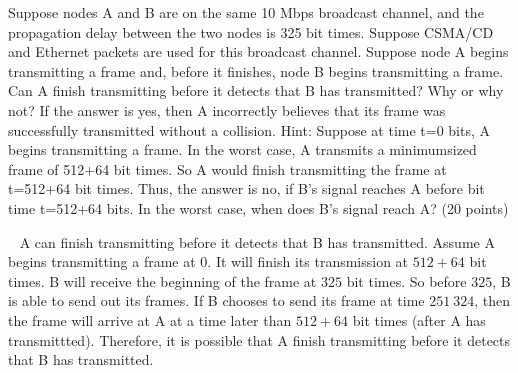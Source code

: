 \begin{exercise}[]{ Suppose nodes A and B are on the same 10 Mbps broadcast channel, and the
    propagation delay between the two nodes is 325 bit times. Suppose CSMA/CD and Ethernet
    packets are used for this broadcast channel. Suppose node A begins transmitting a frame
    and, before it finishes, node B begins transmitting a frame. Can A finish transmitting before
    it detects that B has transmitted? Why or why not? If the answer is yes, then A incorrectly
    believes that its frame was successfully transmitted without a collision. Hint: Suppose at
    time t=0 bits, A begins transmitting a frame. In the worst case, A transmits a minimumsized frame of 512+64 bit times. So A would finish transmitting the frame at t=512+64 bit
    times. Thus, the answer is no, if B’s signal reaches A before bit time t=512+64 bits. In the
    worst case, when does B’s signal reach A? (20 points)}
  \begin{solution}
  \par{~} A can finish transmitting before it detects that B has transmitted. Assume A begins transmitting a frame at $0$. It will finish its transmission at $512+64$ bit times. B will receive the beginning of the frame at $325$ bit times. So before $325$, B is able to send out its frames. If B chooses to send its frame at time $251 ~ 324$, then the frame will arrive at A at a time later than $512 + 64$ bit times (after A has transmittted). Therefore, it is possible that A finish transmitting before it detects that B has transmitted.
  \end{solution}
  \label{ex5}
\end{exercise}



